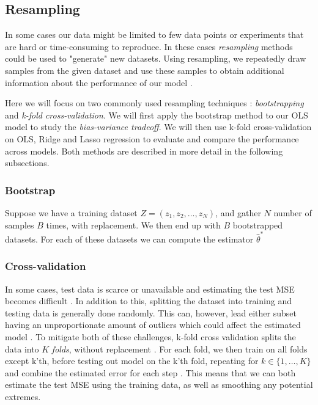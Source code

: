 \documentclass[amssymb,twocolumn,aps]{revtex4}
\begin{document}
\subsection{Resampling}

In some cases our data might be limited to few data points or experiments that 
are hard or time-consuming to reproduce. In these cases \textit{resampling} 
methods could be used to "generate" new datasets. Using resampling, we repeatedly 
draw samples from the given dataset and use these samples to obtain additional 
information about the performance of our model \cite{fysml1} \cite{Hastie-et-al-2009} 
\cite{murphy1}.

Here we will focus on two commonly used resampling techniques \cite{fysml1}: 
\textit{bootstrapping} and \textit{k-fold cross-validation}. We will first apply 
the bootstrap method to our OLS model to study the \textit{bias-variance tradeoff}. 
We will then use k-fold cross-validation on OLS, Ridge and Lasso regression to 
evaluate and compare the performance across models. Both methods are described in more detail in the following subsections.


\subsubsection{Bootstrap}
Suppose we have a training dataset $Z = (z_1, z_2, \dots, z_N)$, and gather $N$ number of samples $B$ times, with replacement. We then end up with $B$ bootstrapped datasets. For each of these datasets we can compute the estimator $\hat{\theta}^*$


\subsubsection{Cross-validation}

In some cases, test data is scarce or unavailable and estimating the test MSE becomes difficult \cite{introstat}. In addition to this, splitting the dataset into training and testing data is generally done randomly. This can, however, lead either subset having an unproportionate amount of outliers which could affect the estimated model \cite{fysml1}. To mitigate both of these challenges, k-fold cross validation splits the data into $K$ \textit{folds}, without replacement \cite{Raschka-et-al-2022}. For each fold, we then train on all folds except k'th, before testing out model on the k'th fold, repeating for $k \in \{1, \dots, K\}$ \cite{murphy1} and combine the estimated error for each step \cite{Hastie-et-al-2009}. This means that we can both estimate the test MSE using the training data, as well as smoothing any potential extremes.
\end{document}
